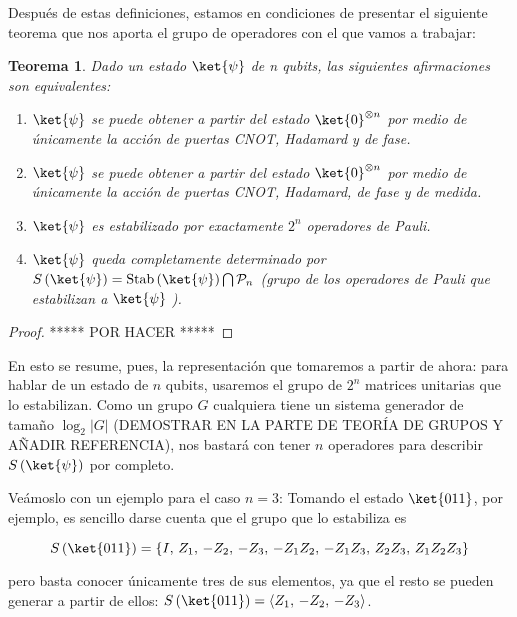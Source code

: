 \documentclass[11pt,a4paper,twoside,pdf]{article}
\numberwithin{equation}{section}
\newtheorem{theorem}{Teorema}
\begin{document}
		Después de estas definiciones, estamos en condiciones de presentar el siguiente teorema que nos aporta el grupo de operadores con el que vamos a trabajar:
		
			\begin{theorem} \label{th: Caracterizacion}
				Dado un estado $\ket{\psi}$ de n qubits, las siguientes afirmaciones son equivalentes:
				\begin{enumerate}[label=(\roman*)]
					\item $\ket{\psi}$ se puede obtener a partir del estado $\ket{0}^{\otimes n}$ por medio de únicamente la acción de puertas CNOT, Hadamard y de fase.
					\item $\ket{\psi}$ se puede obtener a partir del estado $\ket{0}^{\otimes n}$ por medio de únicamente la acción de puertas CNOT, Hadamard, de fase y de medida.
					\item $\ket{\psi}$ es estabilizado por exactamente $2^n$ operadores de Pauli.
					\item $\ket{\psi}$ queda completamente determinado por $S \left( \ket{\psi} \right) = \text{Stab}\left( \ket{\psi}\right) \bigcap \mathcal{P}_n$ (grupo de los operadores de Pauli que estabilizan a $\ket{\psi}$ ).
				\end{enumerate}
			\end{theorem}
		
			\begin{proof}
				***** POR HACER *****
			\end{proof}	
		
		En esto se resume, pues, la representación que tomaremos a partir de ahora: para hablar de un estado de $n$ qubits, usaremos el grupo de $2^n$ matrices unitarias que lo estabilizan. Como un grupo $G$ cualquiera tiene un sistema generador de tamaño $\log_2|G|$ (DEMOSTRAR EN LA PARTE DE TEORÍA DE GRUPOS Y AÑADIR REFERENCIA), nos bastará con tener $n$ operadores para describir $S\left( \ket{\psi}\right) $ por completo.
		
		Veámoslo con un ejemplo para el caso $n=3$:
		Tomando el estado $\ket{011}$, por ejemplo, es sencillo darse cuenta que el grupo que lo estabiliza es 
		
			\begin{equation*}
				S\left( \ket{011} \right) =\{ I,\, Z_1,\, -Z_2,\, -Z_3,\, -Z_1Z_2,\, -Z_1Z_3,\, Z_2Z_3,\, Z_1Z_2Z_3 \}
			\end{equation*}
		
		pero basta conocer únicamente tres de sus elementos, ya que el resto se pueden generar a partir de ellos: $S\left( \ket{011} \right) = \left\langle Z_1, \, -Z_2, \, -Z_3 \right\rangle$.
		
\end{document}
